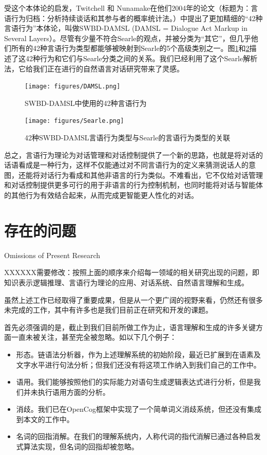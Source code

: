 受这个本体论的启发，Twitchell 和 Nunamake在他们2004年的论文（标题为：言语行为归档：分析持续谈话和其参与者的概率统计法。\cite{Twitchell2004}）中提出了更加精细的“42种言语行为”本体论，叫做SWBD-DAMSL (DAMSL = Dialogue Act Markup in Several Layers）。尽管有少量不符合Searle的观点，并被分类为“其它”，但几乎他们所有的42种言语行为类型都能够被映射到Searle的5个高级类别之一。图\ref{fig:DAMSL}和\ref{fig:Searle}描述了这42种行为和它们与Searle分类之间的关系。我们已经利用了这个Searle解析法，它给我们正在进行的自然语言对话研究带来了灵感。

\begin{figure}[htb]
\centering
\texttt{[image: figures/DAMSL.png]}
\caption{SWBD-DAMSL中使用的42种言语行为}
\label{fig:DAMSL}
\end{figure}

\begin{figure}[htb]
\centering
\texttt{[image: figures/Searle.png]}
\caption{ 42种SWBD-DAMSL言语行为类型与Searle的言语行为类型的关联}
\label{fig:Searle}
\end{figure}


总之，言语行为理论为对话管理和对话控制提供了一个新的思路，也就是将对话的话语看成是一种行为，这样不仅能通过对不同言语行为的定义来猜测说话人的意图，还能将对话行为看成和其他非语言的行为类似。不难看出，它不仅给对话管理和对话控制提供更多可行的用于非语言的行为控制机制，也同时能将对话与智能体的其他行为有效结合起来，从而完成更智能更人性化的对话。

\section{存在的问题}{Omissions of Present Research}

XXXXXX需要修改：按照上面的顺序来介绍每一领域的相关研究出现的问题，即知识表示逻辑推理、言语行为理论的应用、对话系统、自然语言理解和生成。

虽然上述工作已经取得了重要成果，但是从一个更广阔的视野来看，仍然还有很多未完成的工作，其中有许多也是我们目前正在研究和开发的课题。

首先必须强调的是，截止到我们目前所做工作为止，语言理解和生成的许多关键方面一直未被关注，甚至完全被忽略。如以下几个例子：
\begin{itemize}
\item 形态。链语法分析器，作为上述理解系统的初始阶段，最近已扩展到在语素及文字水平进行句法分析；但我们还没有将这项工作纳入到我们自己的工作中。
\item 语用。我们能够按照他们的实际能力对语句生成逻辑表达式进行分析，但是我们并未执行语用方面的分析。
\item 消歧。我们已在OpenCog框架中实现了一个简单词义消歧系统，但还没有集成到本文的工作中。
\item 名词的回指消解。在我们的理解系统内，人称代词的指代消解已通过各种启发式算法实现，但名词的回指却被忽略。
\end{itemize}

